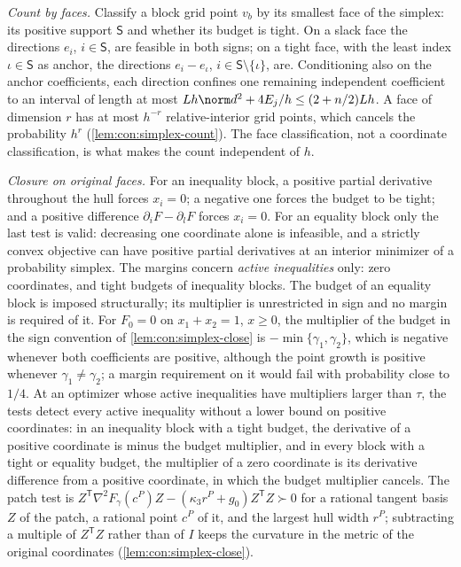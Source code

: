 \emph{Count by faces.} Classify a block grid point $v_b$ by its smallest face
of the simplex: its positive support $\mathsf S$ and whether its budget is
tight. On a slack face the directions $e_i$, $i\in\mathsf S$, are feasible
in both signs; on a tight face, with the least index $\iota\in\mathsf S$ as
anchor, the directions $e_i-e_\iota$, $i\in\mathsf S\setminus\{\iota\}$, are.
Conditioning also on the anchor coefficients, each direction confines one
remaining independent coefficient to an interval of length at most
$Lh\norm d^2+4E_j/h\le(2+n/2)Lh$. A face of dimension $r$ has at most $h^{-r}$
relative-interior grid points, which cancels the probability $h^r$
(\cref{lem:con:simplex-count}). The face classification, not a coordinate
classification, is what makes the count independent of $h$.

\emph{Closure on original faces.} For an inequality block, a positive partial
derivative throughout the hull forces $x_i=0$; a negative one forces the
budget to be tight; and a positive difference $\partial_iF-\partial_lF$
forces $x_i=0$. For an equality block only the last test is valid: decreasing
one coordinate alone is infeasible, and a strictly convex objective can have
positive partial derivatives at an interior minimizer of a probability
simplex. The margins concern \emph{active inequalities} only: zero
coordinates, and tight budgets of inequality blocks. The budget of an
equality block is imposed structurally; its multiplier is unrestricted in
sign and no margin is required of it. For $F_0=0$ on $x_1+x_2=1$, $x\ge0$,
the multiplier of the budget in the sign convention of
\cref{lem:con:simplex-close} is $-\min\{\gamma_1,\gamma_2\}$, which is
negative whenever both coefficients are positive, although the point growth
is positive whenever $\gamma_1\ne\gamma_2$; a margin requirement on it would
fail with probability close to $1/4$. At an optimizer whose active
inequalities have multipliers larger than $\tau$, the tests detect every
active inequality without a lower bound on positive coordinates: in an
inequality block with a tight budget, the derivative of a positive
coordinate is minus the budget multiplier, and in every block with a tight
or equality budget, the multiplier of a zero coordinate is its derivative
difference from a positive coordinate, in which the budget multiplier
cancels. The patch test is
$Z^{\mathsf T}\nabla^2F_\gamma(c^P)Z-(\kappa_3r^P+g_0)Z^{\mathsf T}Z\succ0$ for a
rational tangent basis $Z$ of the patch, a rational point $c^P$ of it, and the
largest hull width $r^P$; subtracting a multiple of $Z^{\mathsf T}Z$ rather
than of $I$ keeps the curvature in the metric of the original coordinates
(\cref{lem:con:simplex-close}).

